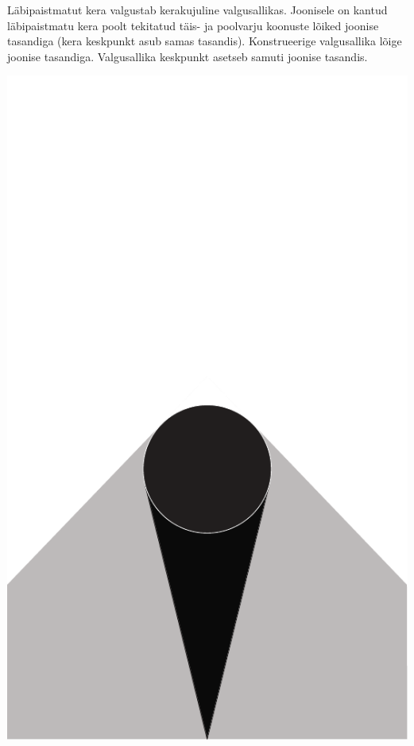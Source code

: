 \documentclass[10pt, twoside]{article}
\begin{document}
{%

Läbipaistmatut kera valgustab kerakujuline valgusallikas. Joonisele on kantud läbipaistmatu kera poolt tekitatud täis- ja poolvarju koonuste lõiked joonise tasandiga (kera keskpunkt asub samas tasandis). Konstrueerige valgusallika lõige joonise tasandiga. Valgusallika keskpunkt asetseb samuti joonise tasandis.

\begin{center}
	\includegraphics[height=0.8\textheight]{2007-v2g-06-yl}
\end{center}
\probend
\bigskip

}
\end{document}
